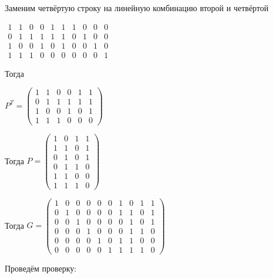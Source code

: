 \documentclass{article}
\begin{document}
	Заменим четвёртую строку на линейную комбинацию второй и четвёртой
	
	$
	\begin{array}{cccccccccc}
	1 & 1 & 0& 0 & 1 & 1 & 1 & 0 & 0 & 0\\
	0 & 1 & 1 & 1 & 1 & 1 & 0 & 1 & 0 & 0\\
	1 & 0 & 0 & 1 & 0 & 1 & 0 & 0 & 1 & 0 \\
	1 & 1 & 1 & 0 & 0 & 0 & 0 & 0 & 0 & 1
	\end{array}
	$
	
	Тогда
	
	$
	P^T = \left(
	\begin{array}{cccccc}
	1 & 1 & 0& 0 & 1 & 1\\
	0 & 1 & 1 & 1 & 1 & 1 \\
	1 & 0 & 0 & 1 & 0 & 1\\
	1 & 1 & 1 & 0 & 0 & 0
	\end{array}
	\right)
	$
	
	Тогда $
	P = \left(
	\begin{array}{cccccc}
	1& 0& 1& 1\\
	1& 1& 0& 1\\
	0 &1 &0 &1\\ 
	0 &1 &1 &0\\
	1 &1 &0 &0\\
	1 &1 &1 &0
	\end{array}
	\right)
	$
	
	Тогда $
	G = \left(
	\begin{array}{cccccccccc}
	1& 0& 0& 0& 0& 0   & 1& 0& 1& 1  \\
	0& 1& 0& 0& 0& 0   & 1& 1& 0& 1  \\
	0 &0 &1 &0 &0 &0   & 0 &1 &0 &1 \\ 
	0 &0 &0 &1 &0 &0   & 0 &1 &1 &0 \\
	0 &0 &0 &0 &1 &0   & 1 &1 &0 &0  \\
	 0 &0 &0 &0 &0 &1  & 1 &1 &1 &0 
	\end{array}
	\right)
	$
	
	Проведём проверку:
	
\end{document}
